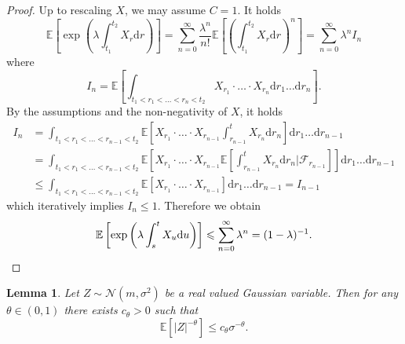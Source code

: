 \documentclass[11pt,oneside,reqno]{amsart}
\newcommand{\mathd}{\mathrm{d}}
\newtheorem{lemma}[theorem]{Lemma}
\numberwithin{equation}{section}
\begin{document}
\begin{proof}
  Up to rescaling $X$, we may assume $C = 1$. It holds
  \[ \mathbb{E} \left[ \exp \left( \lambda \int_{t_1}^{t_2} X_r \mathd r
     \right) \right] = \sum_{n = 0}^{\infty} \frac{\lambda^n}{n!} \mathbb{E}
     \left[ \left( \int_{t_1}^{t_2} X_r \mathd r \right)^n \right] = \sum_{n =
     0}^{\infty} \lambda^n I_n \]
  where
  \[ I_n =\mathbb{E} \left[ \int_{t_1 < r_1 < \ldots < r_n < t_2} X_{r_1}
     \cdot \ldots \cdot X_{r_n} \mathd r_1 \ldots \mathd r_n \right] . \]
  By the assumptions and the non-negativity of $X$, it holds
%  
  \begin{align*}
    I_n & = \int_{t_1 < r_1 < \ldots < r_{n - 1} < t_2} \mathbb{E} \left[
    X_{r_1} \cdot \ldots \cdot X_{r_{n - 1}} \int_{r_{n - 1}}^t X_{r_n} \mathd
    r_n \right] \mathd r_1 \ldots \mathd r_{n - 1}\\
    & = \int_{t_1 < r_1 < \ldots < r_{n - 1} < t_2} \mathbb{E} \left[ X_{r_1}
    \cdot \ldots \cdot X_{r_{n - 1}} \mathbb{E} \left[ \int_{r_{n - 1}}^t
    X_{r_n} \mathd r_n | \mathcal{F}_{r_{n - 1}} \right] \right] \mathd r_1
    \ldots \mathd r_{n - 1}\\
    & \leqslant \int_{t_1 < r_1 < \ldots < r_{n - 1} < t_2} \mathbb{E}
    [X_{r_1} \cdot \ldots \cdot X_{r_{n - 1}}] \mathd r_1 \ldots \mathd r_{n -
    1} = I_{n - 1}
  \end{align*}
%  
  which iteratively implies $I_n \leqslant 1$. Therefore we obtain
  \[ \mathbb{E} \left[ \exp \left( \lambda \int_s^t X_u \mathd u \right)
     \right] \leqslant \sum_{n = 0}^{\infty} \lambda^n = (1 - \lambda)^{- 1} . \qedhere
  \]
\end{proof}

\begin{lemma}
  \label{lem:gauss-lemma2}Let $Z \sim \mathcal{N} (m, \sigma^2)$ be a real
  valued Gaussian variable. Then for any $\theta \in (0, 1)$ there exists
  $c_{\theta} > 0$ such that
  \[ \mathbb{E} [| Z |^{- \theta}] \leqslant c_{\theta} \sigma^{- \theta} . \]
\end{lemma}
\end{document}
